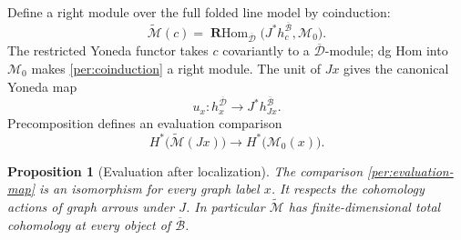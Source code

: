 \documentclass[11pt]{article}
\newtheorem{proposition}[theorem]{Proposition}
\theoremstyle{definition}
\theoremstyle{remark}
\numberwithin{equation}{section}
\begin{document}
Define a right module over the full folded line model by coinduction:
\begin{equation}
 \widetilde{\mathcal M}(c)
   =\operatorname{\mathbf R Hom}_{\overline{\mathcal D}}
       \bigl(J^*h_c^{\overline{\mathcal B}},\mathcal M_0\bigr).
 \label{per:coinduction}
\end{equation}
The restricted Yoneda functor takes $c$ covariantly to a
$\overline{\mathcal D}$-module; dg Hom into $\mathcal M_0$ makes
\eqref{per:coinduction} a right module.  The unit of $Jx$ gives the
canonical Yoneda map
\[
 u_x:h_x^{\overline{\mathcal D}}\longrightarrow
                  J^*h_{Jx}^{\overline{\mathcal B}}.
\]
Precomposition defines an evaluation comparison
\begin{equation}
 H^*\bigl(\widetilde{\mathcal M}(Jx)\bigr)
       \longrightarrow H^*\bigl(\mathcal M_0(x)\bigr).
 \label{per:evaluation-map}
\end{equation}

\begin{proposition}[Evaluation after localization]
\label{per:localization}
The comparison \eqref{per:evaluation-map} is an isomorphism for every
graph label $x$.  It respects the cohomology actions of graph arrows
under $J$.  In particular $\widetilde{\mathcal M}$ has finite-dimensional
total cohomology at every object of $\overline{\mathcal B}$.
\end{proposition}
\end{document}
